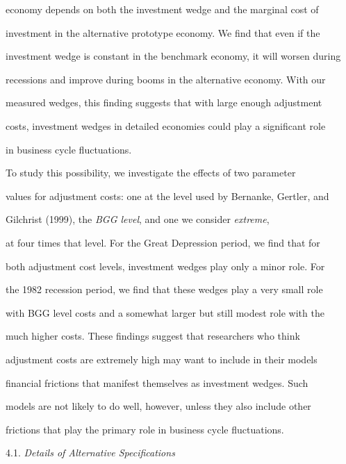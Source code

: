 \documentclass[fleqn,leqno,11pt]{article}
\begin{document}
economy depends on both the investment wedge and the marginal cost of

investment in the alternative prototype economy. We find that even if the

investment wedge is constant in the benchmark economy, it will worsen during

recessions and improve during booms in the alternative economy. With our

measured wedges, this finding suggests that with large enough adjustment

costs, investment wedges in detailed economies could play a significant role

in business cycle fluctuations.



To study this possibility, we investigate the effects of two parameter

values for adjustment costs: one at the level used by Bernanke, Gertler, and

Gilchrist (1999), the \emph{BGG level}, and one we consider \emph{extreme},

at four times that level. For the Great Depression period, we find that for

both adjustment cost levels, investment wedges play only a minor role. For

the 1982 recession period, we find that these wedges play a very small role

with BGG level costs and a somewhat larger but still modest role with the

much higher costs. These findings suggest that researchers who think

adjustment costs are extremely high may want to include in their models

financial frictions that manifest themselves as investment wedges. Such

models are not likely to do well, however, unless they also include other

frictions that play the primary role in business cycle fluctuations.



\bigskip



\begin{center}

4.1. \emph{Details of Alternative Specifications}

\end{center}
\end{document}
